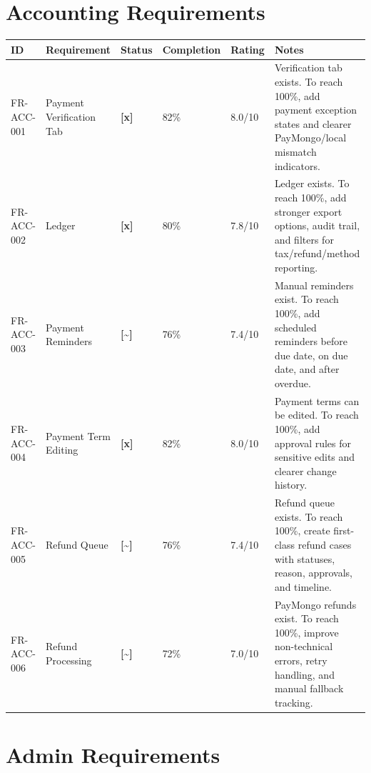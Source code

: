 \documentclass[11pt,a4paper]{article}
\newcommand{\statusdone}{\textbf{[x]}}
\newcommand{\statuspartial}{\textbf{[{\textasciitilde}]}}
\begin{document}
\section{Accounting Requirements}

\begin{longtable}{L{0.15\textwidth} L{0.22\textwidth} C{0.08\textwidth} C{0.10\textwidth} C{0.10\textwidth} L{0.25\textwidth}}
\toprule
\textbf{ID} & \textbf{Requirement} & \textbf{Status} & \textbf{Completion} & \textbf{Rating} & \textbf{Notes} \\
\midrule
FR-ACC-001 & Payment Verification Tab & \statusdone & 82\% & 8.0/10 & Verification tab exists. To reach 100\%, add payment exception states and clearer PayMongo/local mismatch indicators. \\
FR-ACC-002 & Ledger & \statusdone & 80\% & 7.8/10 & Ledger exists. To reach 100\%, add stronger export options, audit trail, and filters for tax/refund/method reporting. \\
FR-ACC-003 & Payment Reminders & \statuspartial & 76\% & 7.4/10 & Manual reminders exist. To reach 100\%, add scheduled reminders before due date, on due date, and after overdue. \\
FR-ACC-004 & Payment Term Editing & \statusdone & 82\% & 8.0/10 & Payment terms can be edited. To reach 100\%, add approval rules for sensitive edits and clearer change history. \\
FR-ACC-005 & Refund Queue & \statuspartial & 76\% & 7.4/10 & Refund queue exists. To reach 100\%, create first-class refund cases with statuses, reason, approvals, and timeline. \\
FR-ACC-006 & Refund Processing & \statuspartial & 72\% & 7.0/10 & PayMongo refunds exist. To reach 100\%, improve non-technical errors, retry handling, and manual fallback tracking. \\
\bottomrule
\end{longtable}

\section{Admin Requirements}
\end{document}
